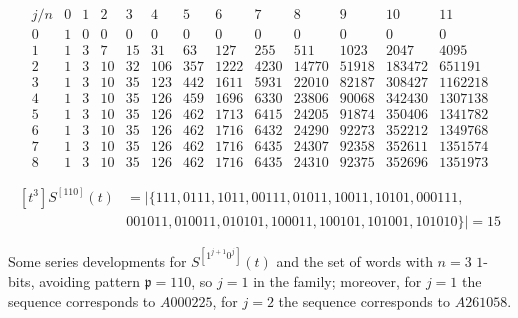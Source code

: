 
\begin{table}
\begin{equation*}\begin{array}{c|cccccccccccc}j/n & 0 & 1 & 2 & 3 & 4 & 5 & 6 & 7 & 8 & 9 & 10 & 11\\\hline0 & 1 & 0 & 0 & 0 & 0 & 0 & 0 & 0 & 0 & 0 & 0 & 0\\1 & 1 & 3 & 7 & 15 & 31 & 63 & 127 & 255 & 511 & 1023 & 2047 & 4095\\2 & 1 & 3 & 10 & 32 & 106 & 357 & 1222 & 4230 & 14770 & 51918 & 183472 & 651191\\3 & 1 & 3 & 10 & 35 & 123 & 442 & 1611 & 5931 & 22010 & 82187 & 308427 & 1162218\\4 & 1 & 3 & 10 & 35 & 126 & 459 & 1696 & 6330 & 23806 & 90068 & 342430 & 1307138\\5 & 1 & 3 & 10 & 35 & 126 & 462 & 1713 & 6415 & 24205 & 91874 & 350406 & 1341782\\6 & 1 & 3 & 10 & 35 & 126 & 462 & 1716 & 6432 & 24290 & 92273 & 352212 & 1349768\\7 & 1 & 3 & 10 & 35 & 126 & 462 & 1716 & 6435 & 24307 & 92358 & 352611 & 1351574\\8 & 1 & 3 & 10 & 35 & 126 & 462 & 1716 & 6435 & 24310 & 92375 & 352696 & 1351973\end{array}\end{equation*}

\begin{displaymath}
\begin{split}
[t^{3}]S^{[110]}(t) &= \big|\lbrace 111, 0111, 1011, 00111, 01011, 10011, 10101, 000111, \\
& 001011, 010011, 010101, 100011, 100101, 101001, 101010\rbrace\big| = 15
\end{split}
\end{displaymath}

\caption{Some series developments for $S^{[1^{j+1}0^j]}(t)$ and the set of
words with $n=3$ $1$-bits, avoiding pattern $\mathfrak{p}=110$, so $j=1$ in the
family; moreover, for $j=1$ the sequence corresponds to $A000225$, for $j=2$ the
sequence corresponds to $A261058$.}
\label{tbl:S1_j1:0_j}
\end{table}

